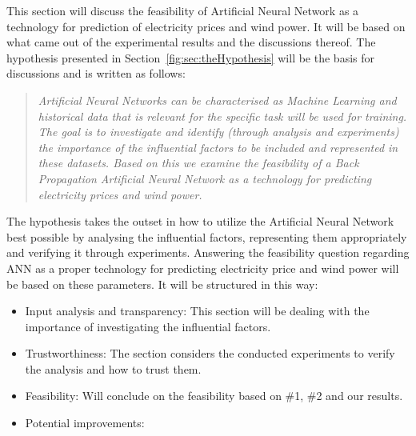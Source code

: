 This section will discuss the feasibility of Artificial Neural Network as a technology for prediction of electricity prices and wind power. It will be based on what came out of the experimental results and the discussions thereof. The hypothesis presented in Section~\ref{fig:sec:theHypothesis} will be the basis for discussions and is written as follows:

\begin{quotation}
\textit{Artificial Neural Networks can be characterised as Machine Learning\cite{18} and historical data that is relevant for the specific task will be used for training. The goal is to investigate and identify (through analysis and experiments) the importance of the influential factors to be included and represented in these datasets. Based on this we examine the feasibility of a Back Propagation Artificial Neural Network as a technology for predicting electricity prices and wind power.}
\end{quotation}

The hypothesis takes the outset in how to utilize the Artificial Neural Network best possible by analysing the influential factors, representing them appropriately and verifying it through experiments. Answering the feasibility question regarding ANN as a proper technology for predicting electricity price and wind power will be based on these parameters. It will be structured in this way:

\begin{itemize}
\item Input analysis and transparency: This section will be dealing with the importance of investigating the influential factors.
\item Trustworthiness: The section considers the conducted experiments to verify the analysis and how to trust them.
\item Feasibility: Will conclude on the feasibility based on \#1, \#2 and our results.
\item Potential improvements:
\end{itemize}

